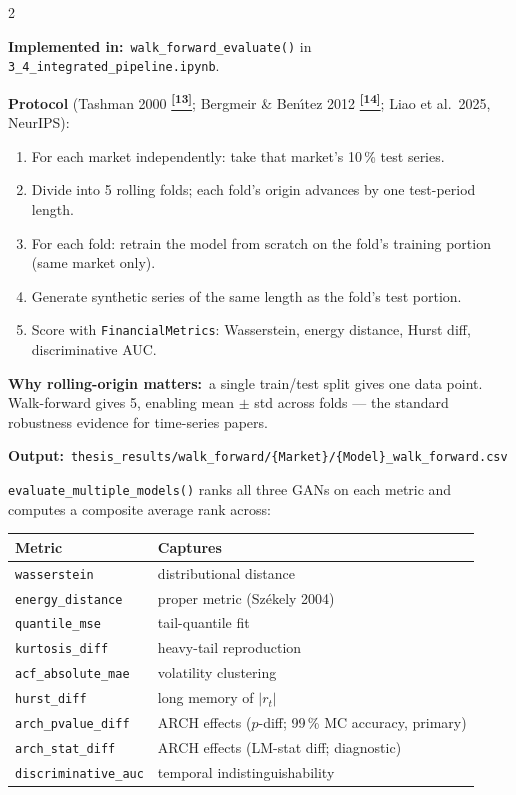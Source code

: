 \documentclass[10pt]{article}
\newcommand{\skybox}[2]{\begin{tcolorbox}[mybox={Sky}{BBg},title={#1}]#2\end{tcolorbox}}
\newcommand{\tealbox}[2]{\begin{tcolorbox}[mybox={Teal}{LBg},title={#1}]#2\end{tcolorbox}}
\newcommand{\tcite}[1]{%
  \hyperlink{R:#1}{\textsuperscript{\scriptsize\textbf{[#1]}}}}
\begin{document}
\begin{multicols}{2}
\columnbreak

\tealbox{Walk-Forward Temporal Validation (CTBench Protocol)}{%
\textbf{Implemented in:}\ \texttt{walk\_forward\_evaluate()} in \texttt{3\_4\_integrated\_pipeline.ipynb}.

\textbf{Protocol} (Tashman 2000\tcite{13}; Bergmeir \& Ben\'{\i}tez 2012\tcite{14}; Liao et al.\ 2025, NeurIPS):
\begin{enumerate}
  \item For each market independently: take that market's 10\,\% test series.
  \item Divide into 5 rolling folds; each fold's origin advances by one test-period length.
  \item For each fold: retrain the model from scratch on the fold's training portion (same market only).
  \item Generate synthetic series of the same length as the fold's test portion.
  \item Score with \texttt{FinancialMetrics}: Wasserstein, energy distance, Hurst diff, discriminative AUC.
\end{enumerate}
\textbf{Why rolling-origin matters:}\ a single train/test split gives one data point. Walk-forward gives 5, enabling mean $\pm$ std across folds --- the standard robustness evidence for time-series papers.

\textbf{Output:}\ \texttt{thesis\_results/walk\_forward/\{Market\}/\{Model\}\_walk\_forward.csv}}

\skybox{Composite Model Comparison Score}{%
\texttt{evaluate\_multiple\_models()} ranks all three GANs on each metric and computes a composite average rank across:

\smallskip
\begin{tabular}{@{}ll@{}}
\toprule
\textbf{Metric} & \textbf{Captures} \\
\midrule
\texttt{wasserstein}        & distributional distance \\
\texttt{energy\_distance}   & proper metric (Sz\'{e}kely 2004) \\
\texttt{quantile\_mse}      & tail-quantile fit \\
\texttt{kurtosis\_diff}     & heavy-tail reproduction \\
\texttt{acf\_absolute\_mae} & volatility clustering \\
\texttt{hurst\_diff}        & long memory of $|r_t|$ \\
\texttt{arch\_pvalue\_diff} & ARCH effects ($p$-diff; 99\,\% MC accuracy, primary) \\
\texttt{arch\_stat\_diff}   & ARCH effects (LM-stat diff; diagnostic) \\
\texttt{discriminative\_auc}& temporal indistinguishability \\
\bottomrule
\end{tabular}

}
\end{multicols}
\end{document}
